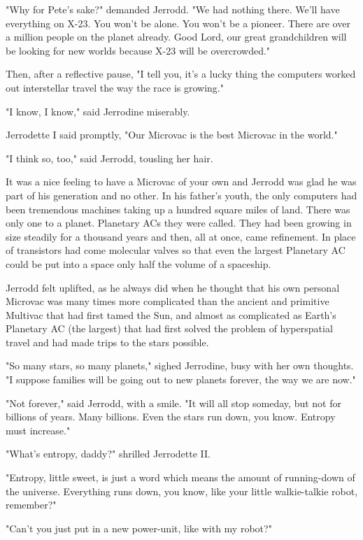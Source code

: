 \documentclass[11pt,twocolumn,paper=a5,pagesize]{article}
\begin{document}
{"Why for Pete's sake?" demanded Jerrodd. "We had nothing there. We'll have everything on X-23. You won't be alone. You won't be a pioneer. There are over a million people on the planet already. Good Lord, our great grandchildren will be looking for new worlds because X-23 will be overcrowded."

Then, after a reflective pause, "I tell you, it's a lucky thing the computers worked out interstellar travel the way the race is growing."

"I know, I know," said Jerrodine miserably.

Jerrodette I said promptly, "Our Microvac is the best Microvac in the world."

"I think so, too," said Jerrodd, tousling her hair.

It was a nice feeling to have a Microvac of your own and Jerrodd was glad he was part of his generation and no other. In his father's youth, the only computers had been tremendous machines taking up a hundred square miles of land. There was only one to a planet. Planetary ACs they were called. They had been growing in size steadily for a thousand years and then, all at once, came refinement. In place of transistors had come molecular valves so that even the largest Planetary AC could be put into a space only half the volume of a spaceship.

Jerrodd felt uplifted, as he always did when he thought that his own personal Microvac was many times more complicated than the ancient and primitive Multivac that had first tamed the Sun, and almost as complicated as Earth's Planetary AC (the largest) that had first solved the problem of hyperspatial travel and had made trips to the stars possible.

"So many stars, so many planets," sighed Jerrodine, busy with her own thoughts. "I suppose families will be going out to new planets forever, the way we are now."

"Not forever," said Jerrodd, with a smile. "It will all stop someday, but not for billions of years. Many billions. Even the stars run down, you know. Entropy must increase."

"What's entropy, daddy?" shrilled Jerrodette II.

"Entropy, little sweet, is just a word which means the amount of running-down of the universe. Everything runs down, you know, like your little walkie-talkie robot, remember?"

"Can't you just put in a new power-unit, like with my robot?"

}
\end{document}
